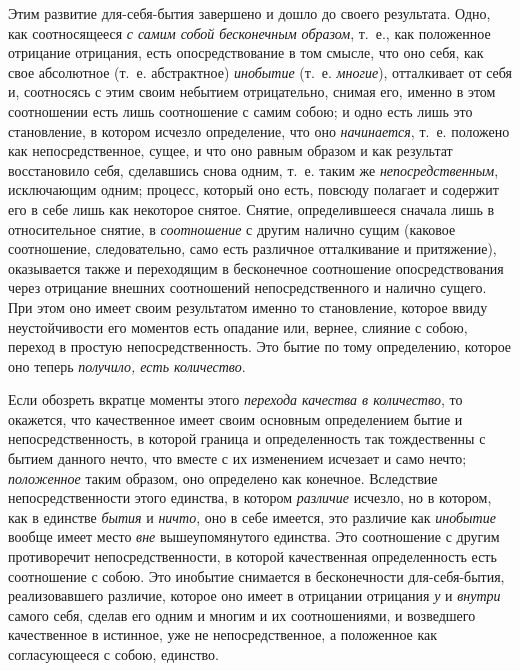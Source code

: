 Этим развитие для-себя-бытия завершено и дошло до своего результата. Одно,
как соотносящееся {\em с самим собой бесконечным
образом}, т.~е., как положенное отрицание отрицания, есть опосредствование
в том смысле, что оно себя, как свое абсолютное (т.~е. абстрактное)
{\em инобытие} (т.~е. {\em многие}), отталкивает от себя и, соотносясь с этим
своим небытием отрицательно, снимая его, именно в этом соотношении есть
лишь соотношение с самим собою; и одно есть лишь это становление, в котором
исчезло определение, что оно {\em начинается}, т.~е.
положено как непосредственное, сущее, и что оно равным образом и как
результат восстановило себя, сделавшись снова одним, т.~е. таким же
{\em непосредственным}, исключающим одним; процесс,
который оно есть, повсюду полагает и содержит его в себе лишь как некоторое
снятое. Снятие, определившееся сначала лишь в относительное снятие, в
{\em соотношение} с другим налично сущим (каковое
соотношение, следовательно, само есть различное отталкивание и
притяжение), оказывается также и переходящим в бесконечное соотношение
опосредствования через отрицание внешних соотношений непосредственного и
налично сущего. При этом оно имеет своим результатом именно то становление,
которое ввиду неустойчивости его моментов есть опадание или, вернее,
слияние с собою, переход в простую непосредственность. Это бытие по тому
определению, которое оно теперь {\em получило, есть количество}.

Если обозреть вкратце моменты этого {\em перехода
качества в количество}, то окажется, что качественное имеет своим основным
определением бытие и непосредственность, в которой граница и определенность
так тождественны с бытием данного нечто, что вместе с их изменением
исчезает и само нечто; {\em положенное} таким образом,
оно определено как конечное. Вследствие непосредственности этого единства,
в котором {\em различие} исчезло, но в котором, как в
единстве {\em бытия} и {\em ничто},
оно в себе имеется, это различие как {\em инобытие}
вообще имеет место {\em вне} вышеупомянутого единства.
Это соотношение с другим противоречит непосредственности, в которой
качественная определенность есть соотношение с собою. Это инобытие
снимается в бесконечности для-себя-бытия, реализовавшего различие, которое
оно имеет в отрицании отрицания {\em у} и
{\em внутри} самого себя, сделав его одним и многим и
их соотношениями, и возведшего качественное в истинное, уже не
непосредственное, а положенное как согласующееся с собою, единство.

